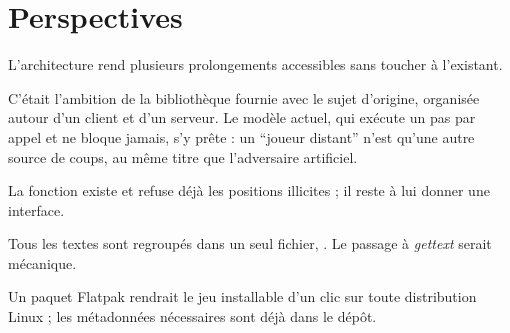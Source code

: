 \section{Perspectives}

L'architecture rend plusieurs prolongements accessibles sans toucher à l'existant.

\begin{description}[style=nextline, leftmargin=1.2em]
    \item[Jeu à deux en réseau]
          C'était l'ambition de la bibliothèque fournie avec le sujet d'origine, organisée autour
          d'un client et d'un serveur. Le modèle actuel, qui exécute un pas par appel et ne
          bloque jamais, s'y prête : un \enquote{joueur distant} n'est qu'une autre source de
          coups, au même titre que l'adversaire artificiel.
    \item[Placement manuel]
          La fonction  existe et refuse déjà les positions
          illicites ; il reste à lui donner une interface.
    \item[Traduction]
          Tous les textes sont regroupés dans un seul fichier, . Le passage à
          \emph{gettext} serait mécanique.
    \item[Distribution]
          Un paquet Flatpak rendrait le jeu installable d'un clic sur toute distribution Linux ;
          les métadonnées nécessaires sont déjà dans le dépôt.
\end{description}
